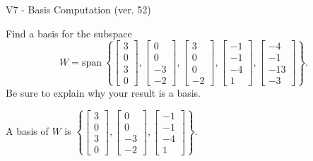 \begin{exercise}
  \begin{exerciseTitle}V7 - Basis Computation (ver. 52)\end{exerciseTitle}
  \begin{exerciseStatement}
    Find a basis for the subspace 
\[W=\mathrm{span}\ \left\{\left[\begin{array}{r}
3 \\
0 \\
3 \\
0
\end{array}\right] , \left[\begin{array}{r}
0 \\
0 \\
-3 \\
-2
\end{array}\right] , \left[\begin{array}{r}
3 \\
0 \\
0 \\
-2
\end{array}\right] , \left[\begin{array}{r}
-1 \\
-1 \\
-4 \\
1
\end{array}\right] , \left[\begin{array}{r}
-4 \\
-1 \\
-13 \\
-3
\end{array}\right]\right\}.\]
 Be sure to explain why your result is a basis.


  \end{exerciseStatement}
  \begin{exerciseAnswer}
   A basis of \(W\) is  \(\left\{\left[\begin{array}{r}
3 \\
0 \\
3 \\
0
\end{array}\right] , \left[\begin{array}{r}
0 \\
0 \\
-3 \\
-2
\end{array}\right] , \left[\begin{array}{r}
-1 \\
-1 \\
-4 \\
1
\end{array}\right]\right\}\).
  


  \end{exerciseAnswer}
\end{exercise}